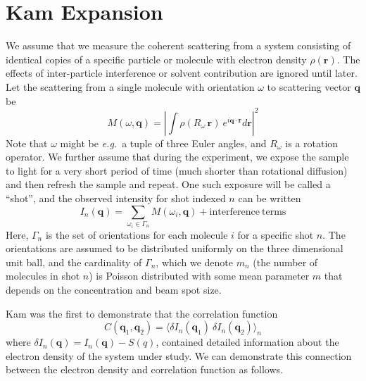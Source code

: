 \documentclass[aps,prl,preprint,groupedaddress]{revtex4-1}
\def\*#1{\mathbf{#1}}
\begin{document}
\section{Kam Expansion}

We assume that we measure the coherent scattering from a system consisting of identical copies of a specific particle or molecule with electron density $\rho(\*{r})$. The effects of inter-particle interference or solvent contribution are ignored until later. Let the scattering from a single molecule with orientation $\omega$ to scattering vector $\*{q}$ be
\begin{equation} \label{molecular-scattering}
M( \omega, \*{q} ) = \left| \int \rho(R_\omega \, \*{r}) \> e^{ i \*{q} \cdot \*{r} } d\*r \right|^2
\end{equation}
Note that $\omega$ might be \textit{e.g.}~a tuple of three Euler angles, and $R_\omega$ is a rotation operator. We further assume that during the experiment, we expose the sample to light for a very short period of time (much shorter than rotational diffusion) and then refresh the sample and repeat. One such exposure will be called a ``shot'', and the observed intensity for shot indexed $n$ can be written
\[
I_n ( \*q ) = \sum_{\omega_i \in \Gamma_n} M( \omega_i, \*{q} ) + \mathrm{interference\ terms}
\]
Here, $\Gamma_n$ is the set of orientations for each molecule $i$ for a specific shot $n$. The orientations are assumed to be distributed uniformly on the three dimensional unit ball, and the cardinality of $\Gamma_n$, which we denote $m_n$ (the number of molecules in shot $n$) is Poisson distributed with some mean parameter $m$ that depends on the concentration and beam spot size.

Kam was the first to demonstrate that the correlation function
\begin{equation}\label{correlation}
C( \*q_1, \*q_2 ) = \big\langle \delta I_n ( \*q_1 ) \> \delta I_n ( \*q_2 ) \big\rangle_n
\end{equation}
where $\delta I_n ( \*q ) = I_n ( \*q ) - S( q )$, contained detailed information about the electron density of the system under study. We can demonstrate this connection between the electron density and correlation function as follows.
\end{document}
